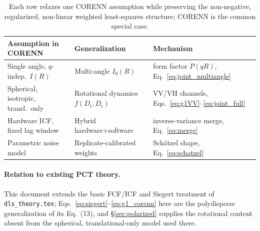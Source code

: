 \documentclass[11pt]{article}
\newcommand{\Dt}{D_{\mathrm t}}
\newcommand{\Dr}{D_{\mathrm r}}
\begin{document}
\begin{table}[h]
\centering
\begin{tabular}{@{}lll@{}}
\toprule
Assumption in CORENN & Generalization & Mechanism \\
\midrule
Single angle, $q$-indep.\ $I(R)$ & Multi-angle $I_0(R)$ & form factor $P(qR)$, Eq.~\eqref{eq:joint_multiangle} \\
Spherical, isotropic, transl.\ only & Rotational dynamics $f(\Dt,\Dr)$ & VV/VH channels, Eqs.~\eqref{eq:g1VV}--\eqref{eq:joint_full} \\
Hardware ICF, fixed lag window & Hybrid hardware+software & inverse-variance merge, Eq.~\eqref{eq:merge} \\
Parametric noise model & Replicate-calibrated weights & Schätzel shape, Eq.~\eqref{eq:schatzel} \\
\bottomrule
\end{tabular}
\caption{Each row relaxes one CORENN assumption while preserving the
non-negative, regularized, non-linear weighted least-squares structure; CORENN
is the common special case.}
\label{tab:generalization}
\end{table}

\paragraph{Relation to existing PCT theory.}
This document extends the basic FCF/ICF and Siegert treatment of
\texttt{dls\_theory.tex}; Eqs.~\eqref{eq:siegert}--\eqref{eq:g1_corenn} here are
the polydisperse generalization of its Eq.~(13), and \S\ref{sec:polarized}
supplies the rotational content absent from the spherical, translational-only
model used there.
\end{document}

